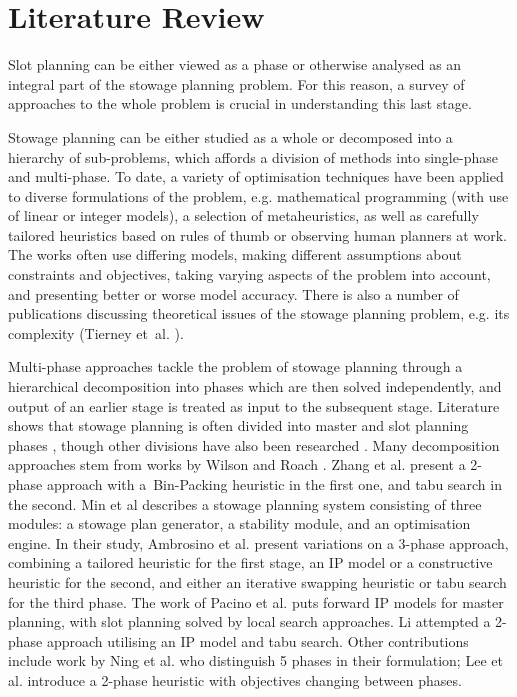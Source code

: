 \documentclass[preprint,11pt,3p]{elsarticle}
\begin{document}
\section{Literature Review}
\label{sec:Literature}
Slot planning can be either viewed as a phase or otherwise analysed as an integral part of the stowage planning problem. For this reason, a survey of approaches to the whole problem is crucial in understanding this last stage. 

Stowage planning can be either studied as a whole or decomposed into a hierarchy of sub-problems, which affords a division of methods into single-phase and multi-phase. To date, a variety of optimisation techniques have been applied to diverse formulations of the problem, e.g. mathematical programming (with use of linear or integer models), a selection of metaheuristics, as well as carefully tailored heuristics based on rules of thumb or observing human planners at work. The works often use differing models, making different assumptions about constraints and objectives, taking varying aspects of the problem into account, and presenting better or worse model accuracy. There is also a number of publications discussing theoretical issues of the stowage planning problem, e.g. its complexity (Tierney et~al. \cite{TPJ14}).

Multi-phase approaches tackle the problem of stowage planning through a hierarchical decomposition into phases which are then solved independently, and output of an earlier stage is treated as input to the subsequent stage. Literature shows that stowage planning is often divided into master and slot planning phases \cite{DPhD, PDJB11}, though other divisions have also been researched \cite{N13}. Many decomposition approaches stem from works by Wilson and Roach \cite{WR00}. Zhang et al. \cite{ZLJ05} present a 2-phase approach with a~Bin-Packing heuristic in the first one, and tabu search in the second. Min et al \cite{MLJYFA10A} describes a stowage planning system consisting of three modules: a stowage plan generator, a stability module, and an optimisation engine. In their study, Ambrosino et al. \cite{AAPS09, AAPS10, APS15} present variations on a 3-phase approach, combining a tailored heuristic for the first stage, an IP model or a constructive heuristic for the second, and either an iterative swapping heuristic or tabu search for the third phase. The work of Pacino et al. \cite{PDJB11} puts forward IP models for master planning, with slot planning solved by local search approaches. Li \cite{L12} attempted a 2-phase approach utilising an IP model and tabu search. Other contributions include work by Ning et al. \cite{N13} who distinguish 5 phases in their formulation; Lee et al. \cite{LFH15} introduce a 2-phase heuristic with objectives changing between phases.
\end{document}
